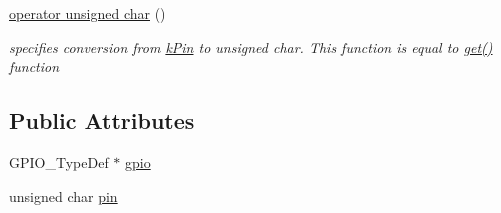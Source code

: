 \begin{DoxyCompactItemize}
\item 
\hyperlink{classkPin_ad68a3e0f49384a776ddd955a7258e95f}{operator unsigned char} ()\hypertarget{classkPin_ad68a3e0f49384a776ddd955a7258e95f}{}\label{classkPin_ad68a3e0f49384a776ddd955a7258e95f}

\begin{DoxyCompactList}\small\item\em specifies conversion from \hyperlink{classkPin}{k\+Pin} to unsigned char. This function is equal to \hyperlink{classkPin_a2ef21ca53fb82456997485b14bac45b0}{get()} function \end{DoxyCompactList}\end{DoxyCompactItemize}
\subsection*{Public Attributes}
\begin{DoxyCompactItemize}
\item 
G\+P\+I\+O\+\_\+\+Type\+Def $\ast$ \hyperlink{classkPin_a3aee22ce5c4e5bc8703f881efa5f3375}{gpio}
\item 
unsigned char \hyperlink{classkPin_a0da283781fc832c77419bc71ff356cc1}{pin}
\end{DoxyCompactItemize}

